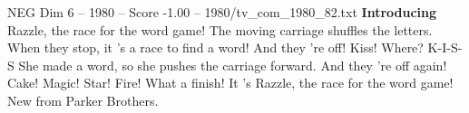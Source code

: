 \begin{textsample}{NEG Dim 6 – 1980 – Score -1.00 – 1980/tv\_com\_1980\_82.txt}  \label{ex:f6_neg_036}
\textbf{Introducing} Razzle, the race for the word game!
The moving carriage shuffles the letters.
When they stop, it 's a race to find a word!
And they 're off!
Kiss!
Where?
K-I-S-S She made a word, so she pushes the carriage forward.
And they 're off again!
Cake!
Magic!
Star!
Fire!
What a finish!
It 's Razzle, the race for the word game!
New from Parker Brothers.

\end{textsample}
